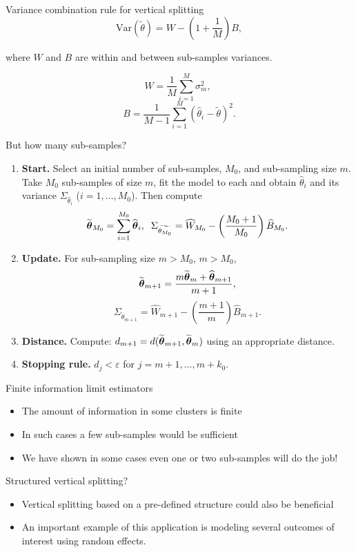 \documentclass{beamer}
\newcommand{\bftheta}{\mbox{\boldmath $\theta$}}
\begin{document}
\begin{frame}{Variance combination rule for vertical splitting}
$$\mathrm{Var}(\widetilde{\theta}) = W - \left(1 + \frac{1}{M}\right) B,$$

where $W$ and $B$ are within and between sub-samples variances.

$$W = \frac{1}{M} \sum_{i=1}^M \sigma^2_m,\;$$ 
$$B = \frac{1}{M-1} \sum_{i=1}^M \left(\widehat{\theta}_i - \widetilde{\theta} \right)^2.$$

\end{frame}

\begin{frame}{But how many sub-samples?}
\begin{enumerate}
\item \textbf{Start.} Select an initial number of sub-samples, $M_0$, and sub-sampling size $m$. Take $M_0$ sub-samples of size $m$, fit the model to each and obtain $\widehat{\theta}_i$ and its variance $\Sigma_{\widehat{\theta}_i}$ ($i=1,\ldots,M_0$). Then compute 
$$\widetilde{\bftheta}_{M_0} = \sum_{i=1}^{M_0} \widehat{\bftheta}_i,\;\; \Sigma_{\widetilde{\theta_{M_0}}}=\widehat{W}_{M_0} - \left( \frac{M_0+1}{M_0} \right) \widehat{B}_{M_0}.$$
			\item \textbf{Update.} For sub-sampling size $m>M_0$, $m>M_0$, 
$$\widetilde{{\bftheta}}_{m+1}=\frac{m\widetilde{\bftheta}_m + \widehat{\bftheta}_{m+1}}{m+1},$$
$$ \Sigma_{\widetilde{\theta}_{m+1}}=\widehat{W}_{m+1} - \left( \frac{m+1}{m} \right) \widehat{B}_{m+1}.$$
	\item \textbf{Distance.} Compute: $d_{m+1}=d(\widetilde{\bftheta}_{m+1},\widetilde{\bftheta}_{m})$ using an appropriate distance.
	\item \textbf{Stopping rule.} $d_{j} < \varepsilon$ for $j=m+1,\ldots,m+k_0$.
\end{enumerate}
\end{frame}

\begin{frame}{Finite information limit estimators}
\begin{itemize}
\item The amount of information in some clusters is finite
\item In such cases a few sub-samples would be sufficient
\item We have shown in some cases even one or two sub-samples will do the job!
\end{itemize}
\end{frame}


\begin{frame}{Structured vertical splitting?}
\begin{itemize}
\item Vertical splitting based on a pre-defined structure could also be beneficial
\item An important example of this application is modeling several outcomes of interest using random effects.
\end{itemize}
\end{frame}
\end{document}
